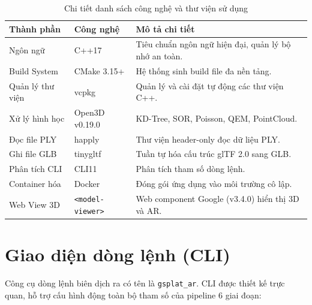 \documentclass[a4paper,12pt]{report}
\begin{document}
\begin{table}[H]
\centering
\small
\renewcommand{\arraystretch}{1.2}
\begin{tabularx}{\textwidth}{|l|l|X|}
\hline
\textbf{Thành phần} & \textbf{Công nghệ} & \textbf{Mô tả chi tiết} \\ \hline
Ngôn ngữ & C++17 & Tiêu chuẩn ngôn ngữ hiện đại, quản lý bộ nhớ an toàn. \\ \hline
Build System & CMake 3.15+ & Hệ thống sinh build file đa nền tảng. \\ \hline
Quản lý thư viện & vcpkg & Quản lý và cài đặt tự động các thư viện C++. \\ \hline
Xử lý hình học & Open3D v0.19.0 & KD-Tree, SOR, Poisson, QEM, PointCloud. \\ \hline
Đọc file PLY & happly & Thư viện header-only đọc dữ liệu PLY. \\ \hline
Ghi file GLB & tinygltf & Tuần tự hóa cấu trúc glTF 2.0 sang GLB. \\ \hline
Phân tích CLI & CLI11 & Phân tích tham số dòng lệnh. \\ \hline
Container hóa & Docker & Đóng gói ứng dụng vào môi trường cô lập. \\ \hline
Web View 3D & \texttt{<model-viewer>} & Web component Google (v3.4.0) hiển thị 3D và AR. \\ \hline
\end{tabularx}
\caption{Chi tiết danh sách công nghệ và thư viện sử dụng}
\label{tab:tech_stack}
\end{table}

\section{Giao diện dòng lệnh (CLI)}
Công cụ dòng lệnh biên dịch ra có tên là \texttt{gsplat\_ar}. CLI được thiết kế trực quan, hỗ trợ cấu hình động toàn bộ tham số của pipeline 6 giai đoạn:
\end{document}
